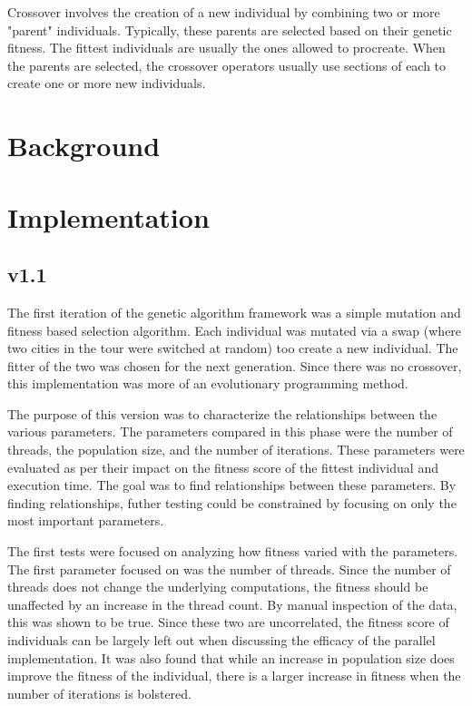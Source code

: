 \documentclass[10pt,letterpaper]{article}
\begin{document}
Crossover involves the creation of a new individual by combining two or more "parent" individuals. Typically, these parents are selected based on their genetic fitness. The fittest individuals are usually the ones allowed to procreate. When the parents are selected, the crossover operators usually use sections of each to create one or more new individuals.  





\section{Background}


\section{Implementation}
\subsection{v1.1}
The first iteration of the genetic algorithm framework was a simple mutation and fitness based selection algorithm. Each individual was mutated via a swap (where two cities in the tour were switched at random) too create a new individual. The fitter of the two was chosen for the next generation. Since there was no crossover, this implementation was more of an evolutionary programming method. 

The purpose of this version was to characterize the relationships between the various parameters. The parameters compared in this phase were the number of threads, the population size, and the number of iterations. These parameters were evaluated as per their impact on the fitness score of the fittest individual and execution time. The goal was to find relationships between these parameters. By finding relationships, futher testing could be constrained by focusing on only the most important parameters. 

The first tests were focused on analyzing how fitness varied with the parameters. The first parameter focused on was the number of threads. Since the number of threads does not change the underlying computations, the fitness should be unaffected by an increase in the thread count. By manual inspection of the data, this was shown to be true. Since these two are uncorrelated, the fitness score of individuals can be largely left out when discussing the efficacy of the parallel implementation. It was also found that while an increase in population size does improve the fitness of the individual, there is a larger increase in fitness when the number of iterations is bolstered.
\end{document}
